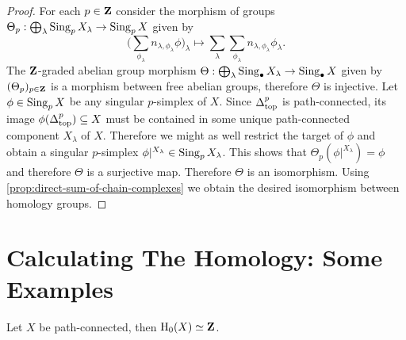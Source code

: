 \begin{proof}
For each \(p \in \mathbf{Z}\) consider the morphism of groups
\(\Theta_p: \bigoplus_{\lambda} \operatorname{Sing}_p X_{\lambda} \to \operatorname{Sing}_p X\) given by
\[
\Big( \sum_{\phi_{\lambda}} n_{\lambda, \phi_{\lambda}} \phi \Big)_{\lambda}
\longmapsto
\sum_{\lambda} \sum_{\phi_{\lambda}} n_{\lambda, \phi_{\lambda}} \phi_{\lambda}.
\]
The \(\mathbf{Z}\)-graded abelian group morphism
\(\Theta: \bigoplus_{\lambda} \operatorname{Sing}_{\bullet} X_{\lambda} \to \operatorname{Sing}_{\bullet}
X\) given by \((\Theta_p)_{p \in \mathbf{Z}}\) is a morphism between free abelian
groups, therefore \(\Theta\) is injective. Let \(\phi \in \operatorname{Sing}_p X\) be any
singular \(p\)-simplex of \(X\). Since \(\Delta_{\text{top}}^p\) is path-connected, its
image \(\phi(\Delta_{\text{top}}^p) \subseteq X\) must be contained in some unique
path-connected component \(X_{\lambda}\) of \(X\). Therefore we might as well
restrict the target of \(\phi\) and obtain a singular \(p\)-simplex
\(\phi|^{X_{\lambda}} \in \operatorname{Sing}_p X_{\lambda}\). This shows that \(\Theta_p(\phi|^{X_{\lambda}}) = \phi\) and
therefore \(\Theta\) is a surjective map. Therefore \(\Theta\) is an isomorphism. Using
\cref{prop:direct-sum-of-chain-complexes} we obtain the desired isomorphism
between homology groups.
\end{proof}

\section{Calculating The Homology: Some Examples}

\begin{proposition}
\label{prop:path-connected-homology0-is-Z}
Let \(X\) be path-connected, then \(\operatorname{H}_0(X) \simeq \mathbf{Z}\).
\end{proposition}

